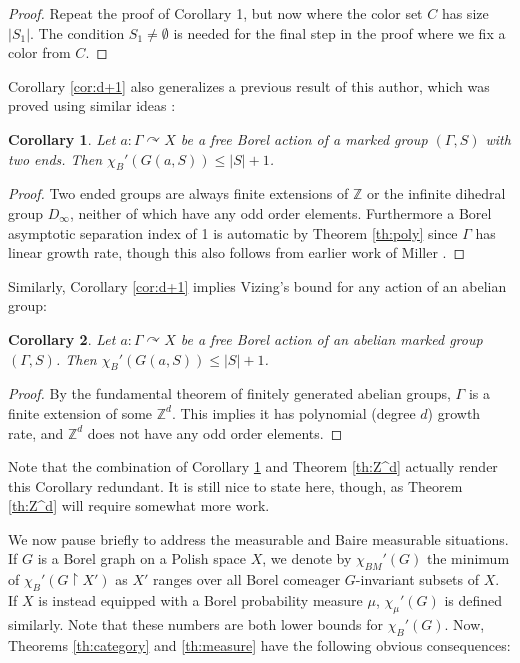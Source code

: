 \documentclass[10pt,a4paper]{article}
\newcommand{\0}{\varnothing}
\newcommand{\Z}{\mathbb{Z}}
\newcommand{\res}{\upharpoonright}
\newtheorem{corollary}{Corollary}
\begin{document}
\begin{proof}
Repeat the proof of Corollary 1, but now where the color set $C$ has size $|S_1|$. The condition $S_1 \neq \emptyset$ is needed for the final step in the proof where we fix a color from $C$.
\end{proof}


Corollary \ref{cor:d+1} also generalizes a previous result of this author, which was proved using similar ideas \cite{W21}: 

\begin{corollary}\label{cor:2end}
Let $a:\Gamma \curvearrowright X$ be a free Borel action of a marked group $(\Gamma,S)$ with two ends. Then $\chi_B'(G(a,S)) \leq |S|+1$.
\end{corollary}
\begin{proof}
Two ended groups are always finite extensions of $\Z$ or the infinite dihedral group $D_\infty$, neither of which have any odd order elements. Furthermore a Borel asymptotic separation index of 1 is automatic by Theorem \ref{th:poly} since $\Gamma$ has linear growth rate, though this also follows from earlier work of Miller \cite{2end}.
\end{proof}

Similarly, Corollary \ref{cor:d+1} implies Vizing's bound for any action of an abelian group:

\begin{corollary}
Let $a:\Gamma \curvearrowright X$ be a free Borel action of an abelian marked group $(\Gamma,S)$. Then $\chi_B'(G(a,S)) \leq |S|+1$.
\end{corollary}
\begin{proof}
By the fundamental theorem of finitely generated abelian groups, $\Gamma$ is a finite extension of some $\Z^d$. This implies it has polynomial (degree $d$) growth rate, and $\Z^d$ does not have any odd order elements.
\end{proof}

Note that the combination of Corollary \ref{cor:2end} and Theorem \ref{th:Z^d} actually render this Corollary redundant. It is still nice to state here, though, as Theorem \ref{th:Z^d} will require somewhat more work. 

We now pause briefly to address the measurable and Baire measurable situations. If $G$ is a Borel graph on a Polish space $X$, we denote by $\chi_{BM}'(G)$ the minimum of $\chi_B'(G \res X')$ as $X'$ ranges over all Borel comeager $G$-invariant subsets of $X$. If $X$ is instead equipped with a Borel probability measure $\mu$, $\chi_\mu'(G)$ is defined similarly. Note that these numbers are both lower bounds for $\chi_B'(G)$. Now, Theorems \ref{th:category} and \ref{th:measure} have the following obvious consequences:
\end{document}
